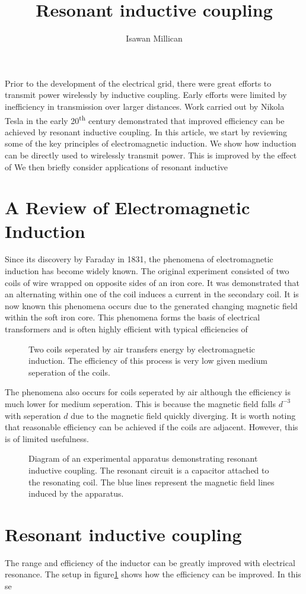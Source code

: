 \documentclass[a4paper,justified,nobib]{tufte-handout}
\begin{document}
\title{Resonant inductive coupling}
\author{Isawan Millican}
\maketitle

Prior to the development of the electrical grid,
there were great efforts to transmit power wirelessly by inductive coupling.
Early efforts were limited by inefficiency in transmission over larger distances.
Work carried out by Nikola Tesla in the early 20\textsuperscript{th} century
demonstrated that improved efficiency can be achieved by resonant inductive coupling.
In this article, we start by reviewing some of the key principles of electromagnetic induction.
We show how induction can be directly used to wirelessly transmit power.
This is improved by the effect of 
We then briefly consider applications of resonant inductive 


\section{A Review of Electromagnetic Induction}

Since its discovery by Faraday in 1831\cite{faradaypublishedfirst},
the phenomena of electromagnetic induction has become widely known.
The original experiment consisted of two coils of wire wrapped on opposite
sides of an iron core.
It was demonstrated that an alternating within one of the coil induces
a current in the secondary coil.
It is now known this phenomena occurs due to the generated changing magnetic
field within the soft iron core.
This phenomena forms the basis of electrical transformers and
is often highly efficient with typical efficiencies of %

\begin{figure}
  \center
  
  \caption{Two coils seperated by air transfers energy by
  electromagnetic induction.
  The efficiency of this process is very low given medium seperation of the coils.}
\end{figure}

The phenomena also occurs for coils seperated by air
although the efficiency is much lower for medium seperation.
This is because the magnetic field falls $d^{-3}$ with seperation $d$
due to the magnetic field quickly diverging.
It is worth noting that reasonable efficiency can be achieved if the coils
are adjacent.
However, this is of limited usefulness.

\begin{figure}
  \center
  
  \caption{Diagram of an experimental apparatus demonstrating resonant inductive coupling.
    The resonant circuit is a capacitor attached to the resonating coil.
    The blue lines represent the magnetic field lines induced by the apparatus.}
    \label{fig:setupresonance}
\end{figure}

\section{Resonant inductive coupling}

The range and efficiency of the inductor can be greatly improved with electrical resonance.
The setup in figure\ref{fig:setupresonance} shows how the efficiency can be improved.
In this se







\printbibliography
\end{document}
